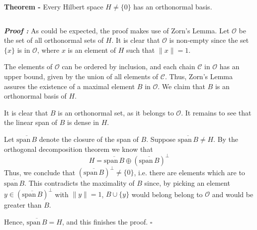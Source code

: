 \documentclass[12pt]{article}
\begin{document}
{\bf Theorem -} Every Hilbert space $H \neq \{0\}$ has an orthonormal basis.

$\,$

{\bf \emph{Proof :}} As could be expected, the proof makes use of Zorn's Lemma. Let $\mathcal{O}$ be the set of all orthonormal sets of $H$. It is clear that $\mathcal{O}$ is non-empty since the set $\{x\}$ is in $\mathcal{O}$, where $x$ is an element of $H$ such that $\|x\| = 1$.

The elements of $\mathcal{O}$ can be ordered by inclusion, and each chain $\mathcal{C}$ in $\mathcal{O}$ has an upper bound, given by the union of all elements of $\mathcal{C}$. Thus, Zorn's Lemma assures the existence of a maximal element $B$ in $\mathcal{O}$. We claim that $B$ is an orthonormal basis of $H$.

It is clear that $B$ is an orthonormal set, as it belongs to $\mathcal{O}$. It remains to see that the linear span of $B$ is dense in $H$.

Let $\overline{\mathrm{span}\,B}$ denote the closure of the span of $B$. Suppose $\overline{\mathrm{span}\,B} \neq H$. By the orthogonal decomposition theorem we know that
\begin{displaymath}
H = \overline{\mathrm{span}\,B} \oplus (\overline{\mathrm{span}\,B})^{\perp}  
\end{displaymath}
Thus, we conclude that $(\overline{\mathrm{span}\,B})^{\perp} \neq \{0\}$, i.e. there are elements which are  to $\overline{\mathrm{span}\,B}$. This contradicts the maximality of $B$ since, by picking an element $y \in (\overline{\mathrm{span}\,B})^{\perp}$ with $\|y\| = 1$,  $B \cup \{y\}$ would belong belong to $\mathcal{O}$ and would be greater than $B$.

Hence, $\overline{\mathrm{span}\,B} = H$, and this finishes the proof. $\square$
\end{document}
